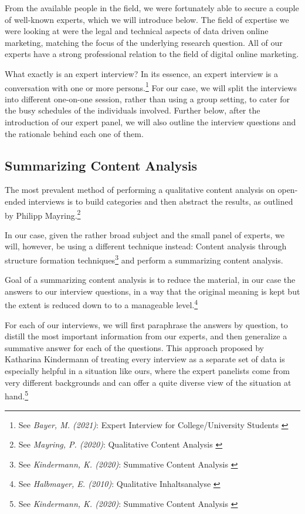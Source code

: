 From the available people in the field, we were fortunately able to secure a couple of well-known experts, which we will introduce below. The field of expertise we were looking at were the legal and technical aspects of data driven online marketing, matching the focus of the underlying research question. All of our experts have a strong professional relation to the field of digital online marketing.

What exactly is an expert interview? In its essence, an expert interview is a conversation with one or more persons.\footnote{See \textit{Bayer, M. (2021)}: Expert Interview for College/University Students \cite{whatIsInterview}} For our case, we will split the interviews into different one-on-one session, rather than using a group setting, to cater for the busy schedules of the individuals involved. Further below, after the introduction of our expert panel, we will also outline the interview questions and the rationale behind each one of them.

\subsection{Summarizing Content Analysis} 

The most prevalent method of performing a qualitative content analysis on open-ended interviews is to build categories and then abstract the results, as outlined by Philipp Mayring.\footnote{See \textit{Mayring, P. (2020)}: Qualitative Content Analysis \cite{qualiContent}}

In our case, given the rather broad subject and the small panel of experts, we will, however, be using a different technique instead: Content analysis through structure formation techniques\footnote{See \textit{Kindermann, K. (2020)}: Summative Content Analysis \cite{summaContent}} and perform a summarizing content analysis.

Goal of a summarizing content analysis is to reduce the material, in our case the answers to our interview questions, in a way that the original meaning is kept but the extent is reduced down to to a manageable level.\footnote{See \textit{Halbmayer, E. (2010)}: Qualitative Inhaltsanalyse \cite{summaryVienna}}

For each of our interviews, we will first paraphrase the answers by question, to distill the most important information from our experts, and then generalize a summative answer for each of the questions. This approach proposed by Katharina Kindermann of treating every interview as a separate set of data is especially helpful in a situation like ours, where the expert panelists come from very different backgrounds and can offer a quite diverse view of the situation at hand.\footnote{See \textit{Kindermann, K. (2020)}: Summative Content Analysis \cite{summaContent}}

